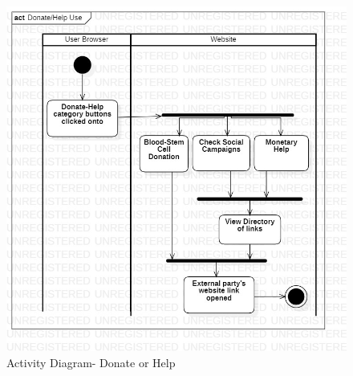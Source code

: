 \begin{figure}[H]
  \centering
  \includegraphics[width=\linewidth]{img/activity-diagram-donate-or-help.jpg}
  \caption{Activity Diagram- Donate or Help}
\end{figure}

